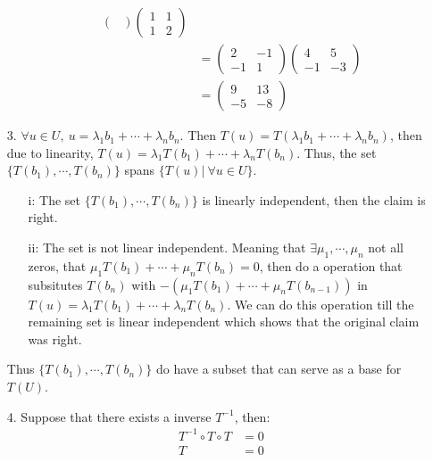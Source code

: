 \documentclass{article}
\begin{document}
\begin{itemize}
\begin{itemize}
\begin{align*}
\begin{pmatrix}
            \end{pmatrix}
            \begin{pmatrix}
                1&1\\
                1&2
            \end{pmatrix}\\
            &=\begin{pmatrix}
                2&-1\\
                -1&1
            \end{pmatrix}
            \begin{pmatrix}
                4&5\\-1&-3
            \end{pmatrix}\\
            &=\begin{pmatrix}
                9&13\\
                -5&-8
            \end{pmatrix}
        \end{align*}
    \end{itemize}
    \item [3.] \(\forall u\in U,\ u = \lambda_1 b_1+\cdots+\lambda_n b_n\). Then \(T(u) = T(\lambda_1 b_1+\cdots+\lambda_n b_n)\), then due to linearity, \(T(u) = \lambda_1T( b_1)+\cdots+\lambda_nT( b_n)\). Thus, the set \(\{T( b_1),\cdots,T( b_n)\}\) spans \(\{T(u)|\ \forall u\in U\}\).
    \begin{itemize}
        \item [i:] The set \(\{T( b_1),\cdots,T( b_n)\}\) is linearly independent, then the claim is right.
        \item [ii:] The set is not linear independent. Meaning that \(\exists \mu_1,\cdots,\mu_n\) not all zeros, that \(\mu_1T(b_1)+\cdots+\mu_nT( b_n) = 0\), then do a operation that subsitutes \(T(b_n)\) with \(-(\mu_1T(b_1)+\cdots+\mu_nT( b_{n-1}))\) in \(T(u) = \lambda_1T( b_1)+\cdots+\lambda_nT( b_n)\). We can do this operation till the remaining set is linear independent which shows that the original claim was right.
    \end{itemize}
    Thus \(\{T( b_1),\cdots,T( b_n)\}\) do have a subset that can serve as a base for \(T(U)\).
    \item [4.]
    Suppose that there exists a inverse \(T^{-1}\), then: \begin{align*}
        T^{-1}\circ T\circ T &= 0 \\
        T&=0
    \end{align*}

\end{itemize}
\end{document}
